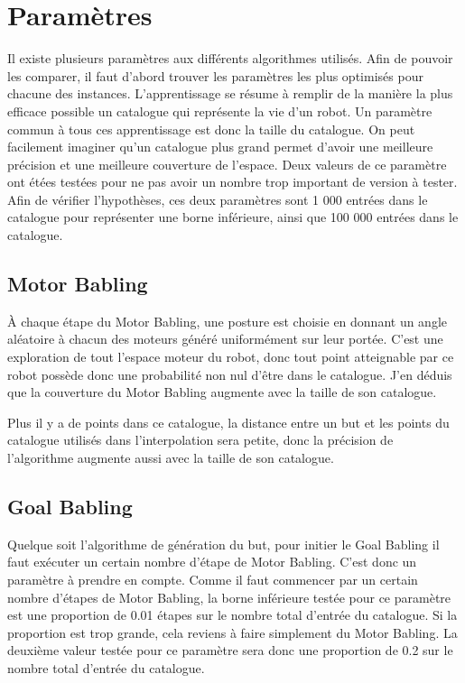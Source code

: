 \documentclass[11pt,french]{report}
\begin{document}
\section{Paramètres}

Il existe plusieurs paramètres aux différents algorithmes utilisés. Afin de pouvoir les comparer, il faut d'abord trouver les paramètres les plus optimisés pour chacune des instances. L'apprentissage se résume à remplir de la manière la plus efficace possible un catalogue qui représente la vie d'un robot. Un paramètre commun à tous ces apprentissage est donc la taille du catalogue. On peut facilement imaginer qu'un catalogue plus grand permet d'avoir une meilleure précision et une meilleure couverture de l'espace. Deux valeurs de ce paramètre ont étées testées pour ne pas avoir un nombre trop important de version à tester. Afin de vérifier l'hypothèses, ces deux paramètres sont 1 000 entrées dans le catalogue pour représenter une borne inférieure, ainsi que 100 000 entrées dans le catalogue.

\subsection{Motor Babling}

\`A chaque étape du Motor Babling, une posture est choisie en donnant un angle aléatoire à chacun des moteurs généré uniformément sur leur portée. C'est une exploration de tout l'espace moteur du robot, donc tout point atteignable par ce robot possède donc une probabilité non nul d'être dans le catalogue. J'en déduis que la couverture du Motor Babling augmente avec la taille de son catalogue.

Plus il y a de points dans ce catalogue, la distance entre un but et les points du catalogue utilisés dans l'interpolation sera petite, donc la précision de l'algorithme augmente aussi avec la taille de son catalogue.

\subsection{Goal Babling}

Quelque soit l'algorithme de génération du but, pour initier le Goal Babling il faut exécuter un certain nombre d'étape de Motor Babling. C'est donc un paramètre à prendre en compte. Comme il faut commencer par un certain nombre d'étapes de Motor Babling, la borne inférieure testée pour ce paramètre est une proportion de 0.01 étapes sur le nombre total d'entrée du catalogue. Si la proportion est trop grande, cela reviens à faire simplement du Motor Babling. La deuxième valeur testée pour ce paramètre sera donc une proportion de 0.2 sur le nombre total d'entrée du catalogue.
\end{document}
